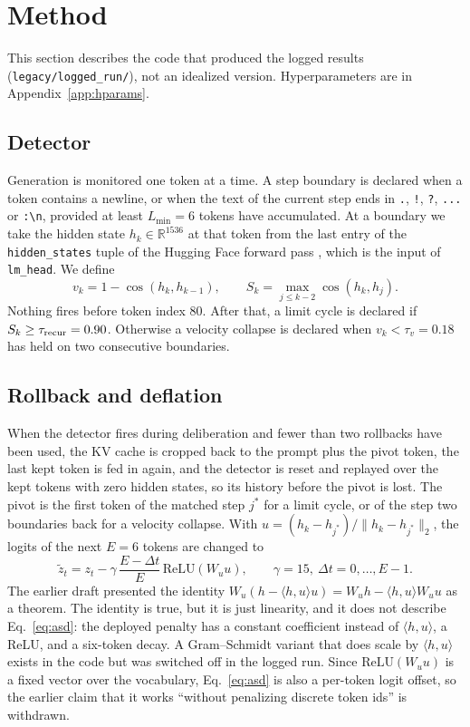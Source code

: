 \documentclass[11pt]{article}
\begin{document}
\section{Method}

This section describes the code that produced the logged results (\texttt{legacy/logged\_run/}), not an idealized version. Hyperparameters are in Appendix~\ref{app:hparams}.

\subsection{Detector}
Generation is monitored one token at a time. A step boundary is declared when a token contains a newline, or when the text of the current step ends in \texttt{.}, \texttt{!}, \texttt{?}, \texttt{...} or \texttt{:\textbackslash n}, provided at least $L_{\min}=6$ tokens have accumulated. At a boundary we take the hidden state $h_k\in\mathbb{R}^{1536}$ at that token from the last entry of the \texttt{hidden\_states} tuple of the Hugging Face forward pass \citep{wolf2020transformers}, which is the input of \texttt{lm\_head}. We define
\begin{equation}
v_k = 1-\cos(h_k,h_{k-1}), \qquad S_k=\max_{j\le k-2}\cos(h_k,h_j).
\end{equation}
Nothing fires before token index 80. After that, a limit cycle is declared if $S_k\ge\tau_{\rm recur}=0.90$. Otherwise a velocity collapse is declared when $v_k<\tau_v=0.18$ has held on two consecutive boundaries.

\subsection{Rollback and deflation}\label{sec:rollback}
When the detector fires during deliberation and fewer than two rollbacks have been used, the KV cache is cropped back to the prompt plus the pivot token, the last kept token is fed in again, and the detector is reset and replayed over the kept tokens with zero hidden states, so its history before the pivot is lost. The pivot is the first token of the matched step $j^\ast$ for a limit cycle, or of the step two boundaries back for a velocity collapse. With $u=(h_k-h_{j^\ast})/\|h_k-h_{j^\ast}\|_2$, the logits of the next $E=6$ tokens are changed to
\begin{equation}
\tilde z_t = z_t - \gamma\,\frac{E-\Delta t}{E}\,\mathrm{ReLU}(W_u u),\qquad \gamma=15,\ \Delta t=0,\dots,E-1 .
\label{eq:asd}
\end{equation}
The earlier draft presented the identity $W_u(h-\langle h,u\rangle u)=W_uh-\langle h,u\rangle W_uu$ as a theorem. The identity is true, but it is just linearity, and it does not describe Eq.~\eqref{eq:asd}: the deployed penalty has a constant coefficient instead of $\langle h,u\rangle$, a ReLU, and a six-token decay. A Gram--Schmidt variant that does scale by $\langle h,u\rangle$ exists in the code but was switched off in the logged run. Since $\mathrm{ReLU}(W_uu)$ is a fixed vector over the vocabulary, Eq.~\eqref{eq:asd} is also a per-token logit offset, so the earlier claim that it works ``without penalizing discrete token ids'' is withdrawn.
\end{document}
